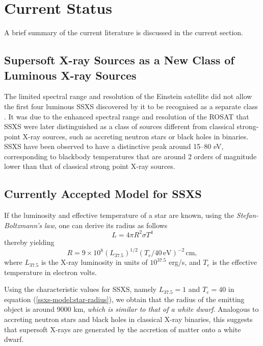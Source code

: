     \section{Current Status} \label{introduction:current_status}
        A brief summary of the current literature is discussed in the current section.
        
        \subsection{Supersoft X-ray Sources as a New Class of Luminous X-ray Sources} \label{introduction:current_status:new-class}
        	The limited spectral range and resolution of the Einstein satellite did not allow the first four luminous SSXS discovered by it to be recognised as a separate class \cite{long81,seward81}. It was due to the enhanced spectral range and resolution of the ROSAT that SSXS were later distinguished as a class of sources different from classical strong-point X-ray sources, such as accreting neutron stars or black holes in binaries. SSXS have been observed to have a distinctive peak around 15--80 eV, corresponding to blackbody temperatures that are around 2 orders of magnitude lower than that of classical strong point X-ray sources.
        	
        \subsection{Currently Accepted Model for SSXS} \label{introduction:current_status:ssxs-model}
        	If the luminosity and effective temperature of a star are known, using the \emph{Stefan-Boltzmann's law}, one can derive its radius as follows
        	\begin{equation} \label{ssxs-model:stef-boltz}
        		L=4\pi R^2\sigma T^4
        	\end{equation}
        	thereby yielding
        	\begin{equation} \label{ssxs-model:star-radius}
        		R=9\times 10^8(L_{37.5})^{1/2}(T_e/40\,\mathrm{eV})^{-2}\,\mathrm{cm,}
        	\end{equation}
        	where $L_{37.5}$ is the X-ray luminosity in units of $10^{37.5}$ erg/s, and $T_e$ is the effective temperature in electron volts.
        	
        	Using the characteristic values for SSXS, namely $L_{37.5}=1$ and $T_e=40$ in equation (\ref{ssxs-model:star-radius}), we obtain that the radius of the emitting object is around 9000 km, \emph{which is similar to that of a white dwarf}. Analogous to accreting neutron stars and black holes in classical X-ray binaries, this suggests that supersoft X-rays are generated by the accretion of matter onto a white dwarf.
        	
